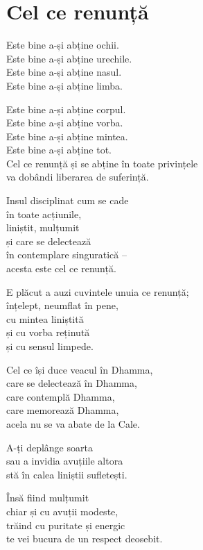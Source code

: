 
\chapter{Cel ce renunță}


Este bine a-și abține ochii.\\
Este bine a-și abține urechile.\\
Este bine a-și abține nasul.\\
Este bine a-și abține limba.


Este bine a-și abține corpul.\\
Este bine a-și abține vorba.\\
Este bine a-și abține mintea.\\
Este bine a-și abține tot.\\
Cel ce renunță și se abține în toate privințele\\
va dobândi liberarea de suferință.


Insul disciplinat cum se cade\\
în toate acțiunile,\\
liniștit, mulțumit\\
și care se delectează\\
în contemplare singuratică –\\
acesta este cel ce renunță.


E plăcut a auzi cuvintele unuia ce renunță;\\
înțelept, neumflat în pene,\\
cu mintea liniștită\\
și cu vorba reținută\\
și cu sensul limpede.


Cel ce își duce veacul în Dhamma,\\
care se delectează în Dhamma,\\
care contemplă Dhamma,\\
care memorează Dhamma,\\
acela nu se va abate de la Cale.


A-ți deplânge soarta\\
sau a invidia avuțiile altora\\
stă în calea liniștii sufletești.


Însă fiind mulțumit\\
chiar și cu avuții modeste,\\
trăind cu puritate și energic\\
te vei bucura de un respect deosebit.


